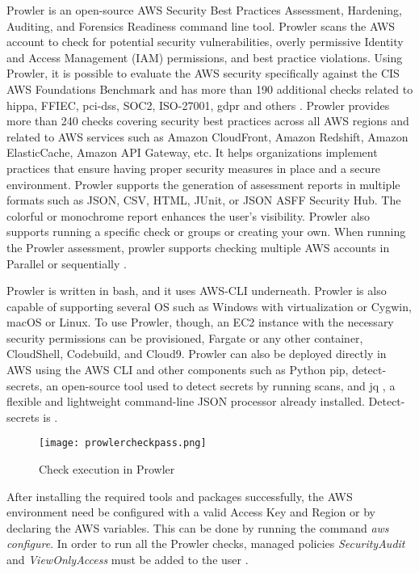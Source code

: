 \hfill \break
\par Prowler is an open-source AWS Security Best Practices Assessment, Hardening, Auditing, and Forensics Readiness command line tool.
Prowler scans the AWS account to check for potential security vulnerabilities, overly permissive Identity and Access Management (IAM) permissions, and best practice violations.
Using Prowler, it is possible to evaluate the AWS
security specifically against the CIS AWS Foundations
Benchmark and has more than 190 additional checks related
to \gls{hippa}, FFIEC, \gls{pci-dss}, SOC2, ISO-27001,
\gls{gdpr}
and
others \cite{49}.
Prowler provides more than 240 checks covering security best practices across all AWS regions and related to AWS services such as Amazon CloudFront, Amazon Redshift, Amazon ElasticCache, Amazon API Gateway, etc.
It helps organizations implement practices that ensure
having proper security measures in place and a secure
environment.
Prowler supports the generation of assessment reports in multiple formats such as JSON, CSV, HTML, JUnit, or JSON ASFF Security Hub.
The colorful or monochrome report enhances the user’s visibility.
Prowler also supports running a specific check or groups or creating your own.
When running the Prowler assessment, prowler supports
checking multiple AWS accounts in Parallel or
sequentially \cite{50}.\\
\hfill \break
\par Prowler is written in bash, and it uses AWS-CLI
underneath.
Prowler is also capable of supporting several OS such as Windows with virtualization or Cygwin, macOS or Linux.
To use Prowler, though, an EC2 instance with the necessary security permissions can be provisioned, Fargate or any other container, CloudShell, Codebuild, and Cloud9.
Prowler can also be deployed directly in AWS using the AWS
CLI and other components such as Python pip,
detect-secrets, an open-source tool used to detect secrets by running scans, and jq , a flexible and lightweight command-line JSON processor already installed.
Detect-secrets is  \cite{50}.
\hfill \break
\begin{figure}
    \centering
    \texttt{[image: prowlercheckpass.png]}
    \caption{Check execution in Prowler}
    \label{fig:prowlercheckexecution}
\end{figure}

\par After installing the required tools and packages
successfully, the AWS environment need be configured with
a valid Access Key and Region or by declaring the AWS
variables.
This can be done by running the command \textit{aws configure}.
In order to run all the Prowler checks, managed policies
\textit{SecurityAudit} and \textit{ViewOnlyAccess} must
be added to the user \cite{47}.




